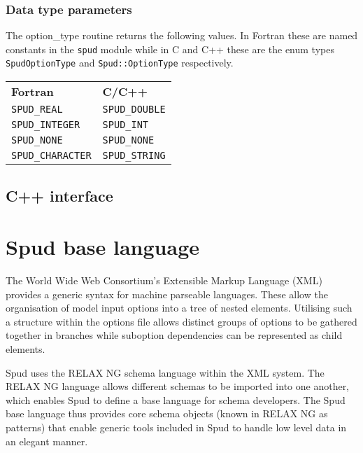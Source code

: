 \documentclass[a4paper, 11pt]{book}
\begin{document}
\subsection{Data type parameters}\label{sec:types}

The option\_type routine returns the following values. In Fortran these are
named constants in the \lstinline+spud+ module while in C and C++ these are
the enum types \lstinline+SpudOptionType+ and \lstinline+Spud::OptionType+
respectively. 

\begin{tabular}{ll}
  \textbf{Fortran} & \textbf{C/C++} \\
  \lstinline+SPUD_REAL+ & \lstinline+SPUD_DOUBLE+\\
  \lstinline+SPUD_INTEGER+ & \lstinline+SPUD_INT+\\
  \lstinline+SPUD_NONE+ & \lstinline+SPUD_NONE+\\
  \lstinline+SPUD_CHARACTER+ & \lstinline+SPUD_STRING+
\end{tabular}

\section{C++ interface}
\lstset{language=C++}

\chapter{Spud base language}
\lstset{language=rnc}

The World Wide Web Consortium's Extensible Markup Language (XML) provides a generic syntax for machine parseable languages.  These allow the organisation of model input options into a tree of nested elements.  Utilising such a structure within the options file allows distinct groups of options to be gathered together in branches while suboption dependencies can be  represented as child elements.

Spud uses the RELAX NG schema language within the XML system.  The RELAX NG language allows different schemas to be imported into one another, which enables Spud to define a base language for schema developers.  The Spud base language thus provides core schema objects (known in RELAX NG as patterns) that enable generic tools included in Spud to handle low level data in an elegant manner.
\end{document}
